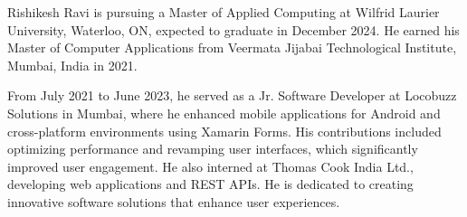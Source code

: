 \documentclass{ieeeaccess}
\begin{document}
%
%
%
%
%
%

\begin{IEEEbiography}{Rishikesh Ravi} is pursuing a Master of Applied Computing at Wilfrid Laurier University, Waterloo, ON, expected to graduate in December 2024. He earned his Master of Computer Applications from Veermata Jijabai Technological Institute, Mumbai, India in 2021.
	
	From July 2021 to June 2023, he served as a Jr. Software Developer at Locobuzz Solutions in Mumbai, where he enhanced mobile applications for Android and cross-platform environments using Xamarin Forms. His contributions included optimizing performance and revamping user interfaces, which significantly improved user engagement. He also interned at Thomas Cook India Ltd., developing web applications and REST APIs. He is dedicated to creating innovative software solutions that enhance user experiences.
\end{IEEEbiography}
\end{document}
